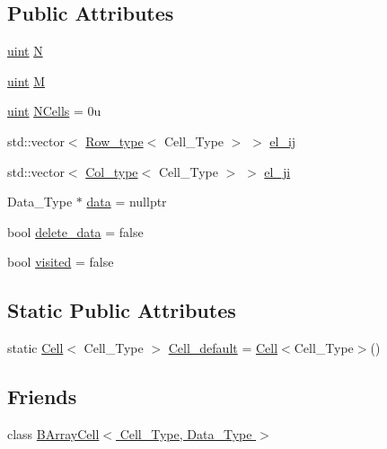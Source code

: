 \subsection*{Public Attributes}
\begin{DoxyCompactItemize}
\item 
\hyperlink{typedefs_8hpp_a91ad9478d81a7aaf2593e8d9c3d06a14}{uint} \hyperlink{class_b_array_a4b34ec8636c989efe80bbe3f1cea217e}{N}
\item 
\hyperlink{typedefs_8hpp_a91ad9478d81a7aaf2593e8d9c3d06a14}{uint} \hyperlink{class_b_array_a197359753fd1bc054a1a14f7641d3fd1}{M}
\item 
\hyperlink{typedefs_8hpp_a91ad9478d81a7aaf2593e8d9c3d06a14}{uint} \hyperlink{class_b_array_a31fd64c6b54408ca98e07abc9c4241c5}{N\+Cells} = 0u
\item 
std\+::vector$<$ \hyperlink{typedefs_8hpp_a83d6ee40a2ba22844108bb8b82e9b951}{Row\+\_\+type}$<$ Cell\+\_\+\+Type $>$ $>$ \hyperlink{class_b_array_a2161dc7c2046a57d3e663ac5c0d70431}{el\+\_\+ij}
\item 
std\+::vector$<$ \hyperlink{typedefs_8hpp_a00f3fedec1671706175b572e5c57ee0b}{Col\+\_\+type}$<$ Cell\+\_\+\+Type $>$ $>$ \hyperlink{class_b_array_aad8ce1aa5fddd3899164c1aa1dfede94}{el\+\_\+ji}
\item 
Data\+\_\+\+Type $\ast$ \hyperlink{class_b_array_a9576163b52124021575e50dbcca2f6b9}{data} = nullptr
\item 
bool \hyperlink{class_b_array_a1e932e3353905d77a2062560ee96b2fc}{delete\+\_\+data} = false
\item 
bool \hyperlink{class_b_array_ae0860bf21425397d1498f94da6518e85}{visited} = false
\end{DoxyCompactItemize}
\subsection*{Static Public Attributes}
\begin{DoxyCompactItemize}
\item 
static \hyperlink{class_cell}{Cell}$<$ Cell\+\_\+\+Type $>$ \hyperlink{class_b_array_a5700cd9bb3814f84c62dda0ea47931bc}{Cell\+\_\+default} = \hyperlink{class_cell}{Cell}$<$Cell\+\_\+\+Type$>$()
\end{DoxyCompactItemize}
\subsection*{Friends}
\begin{DoxyCompactItemize}
\item 
class \hyperlink{class_b_array_a2cd2ece8a4fc1027d3151b1ec33151cb}{B\+Array\+Cell$<$ Cell\+\_\+\+Type, Data\+\_\+\+Type $>$}
\end{DoxyCompactItemize}


